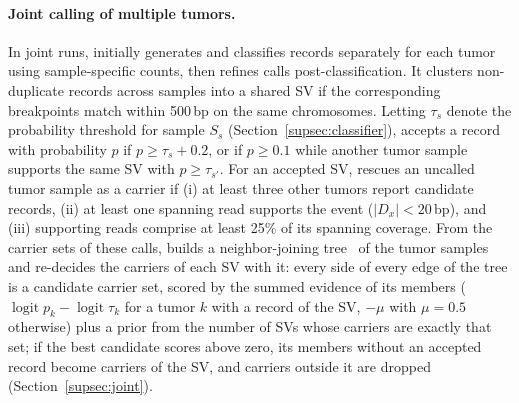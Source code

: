 \vspace*{-0.3cm}
\paragraph{Joint calling of multiple tumors.}
In joint runs, \tool initially generates and classifies records separately for each tumor using sample-specific counts, then refines calls post-classification.
It clusters non-duplicate records across samples into a shared SV if the corresponding breakpoints match within 500\,bp on the same chromosomes.
Letting $\tau_s$ denote the probability threshold for sample $S_s$ (Section~\ref{supsec:classifier}), \tool accepts a record with probability $p$ if $p \ge \tau_s + 0.2$, or if $p \ge 0.1$ while another tumor sample supports the same SV with $p \ge \tau_{s'}$.
For an accepted SV, \tool rescues an uncalled tumor sample as a carrier if (i) at least three other tumors report candidate records, (ii) at least one spanning read supports the event ($|D_x| < 20$\,bp), and (iii) supporting reads comprise at least 25\% of its spanning coverage.
From the carrier sets of these calls, \tool builds a neighbor-joining tree~\cite{nj} of the tumor samples and re-decides the carriers of each SV with it: every side of every edge of the tree is a candidate carrier set, scored by the summed evidence of its members ($\operatorname{logit} p_k - \operatorname{logit} \tau_k$ for a tumor $k$ with a record of the SV, $-\mu$ with $\mu=0.5$ otherwise) plus a prior from the number of SVs whose carriers are exactly that set; if the best candidate scores above zero, its members without an accepted record become carriers of the SV, and carriers outside it are dropped (Section~\ref{supsec:joint}).

